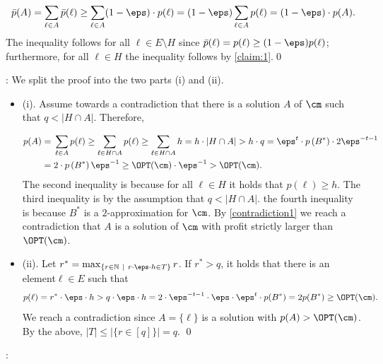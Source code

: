 	
	$$\bar{p}(A) = \sum_{\ell \in A} \bar{p}(\ell) \geq \sum_{\ell \in A} (1-\eps) \cdot p(\ell) = (1-\eps) \sum_{\ell \in A} p(\ell) = (1-\eps) \cdot p(A).$$ The inequality follows for all $\ell \in E \setminus H$ since $\bar{p}(\ell) = p(\ell) \geq (1-\eps) p(\ell)$; furthermore, for all $\ell \in H$ the inequality follows by \eqref{claim:1}.\qed






	: 
	We split the proof into the two parts (i) and (ii). 

\begin{itemize}
	\item(i). 	Assume towards a contradiction that there is a solution $A$ of $\cm$ such that $q < |H \cap A|$. Therefore, 
	
	
	
	\begin{equation}
		\label{contradiction1}
		\begin{aligned}
			p(A) ={} & \sum_{\ell \in A} p(\ell) \geq  \sum_{\ell \in H \cap A} p(\ell) \geq \sum_{\ell \in H \cap A} h   = h \cdot |H \cap A| > h \cdot q = \eps^{t} \cdot p\left(B^*\right) \cdot 2 \eps^{-t-1} \\ ={} & 2 \cdot p\left(B^*\right)  \eps^{-1} \geq \OPT(\cm) \cdot \eps^{-1}  >   \OPT(\cm). 
		\end{aligned}
	\end{equation} The second inequality is because for all $\ell \in H$ it holds that $p(\ell) \geq h$. The third inequality is by the assumption that $q < |H \cap A|$. the fourth inequality is because $B^*$ is a $2$-approximation for $\cm$. By \eqref{contradiction1} we reach a contradiction that $A$ is a solution of $\cm$ with profit strictly larger than $\OPT(\cm)$. 
	
	\item(ii). 	Let $r^* =  \max_{\{r \in \mathbb{N}~|~ r \cdot \eps \cdot h \in T\}} r$. If $r^* >q$, it holds that there is an element$\ell \in E$ such that $$p(\ell) = r^* \cdot \eps \cdot h > q \cdot \eps \cdot  h = 2 \cdot \eps^{-t-1} \cdot \eps \cdot \eps^{t} \cdot p(B^*) = 2p(B^*)  \geq \OPT(\cm).$$ We reach a contradiction since $A = \{\ell\}$ is a solution with $p(A) > \OPT(\cm)$. By the above, $|T| \leq |\{r \in[q]\}| = q.$ \qed
\end{itemize}

	: 
	
